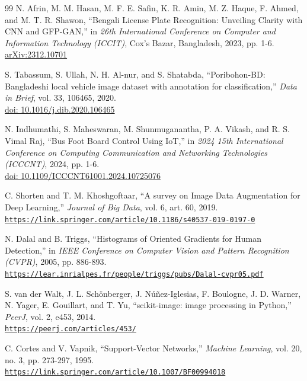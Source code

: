 \documentclass{article}
\renewcommand{\url}[1]{\href{#1}{\nolinkurl{#1}}}
\begin{document}
\begin{thebibliography}{99}
N. Afrin, M. M. Hasan, M. F. E. Safin, K. R. Amin, M. Z. Haque, F. Ahmed, and M. T. R. Shawon,
``Bengali License Plate Recognition: Unveiling Clarity with CNN and GFP-GAN,''
in \textit{26th International Conference on Computer and Information Technology (ICCIT)}, Cox's Bazar, Bangladesh, 2023, pp. 1-6.\\
\href{https://arxiv.org/abs/2312.10701}{arXiv:2312.10701}

S. Tabassum, S. Ullah, N. H. Al-nur, and S. Shatabda,
``Poribohon-BD: Bangladeshi local vehicle image dataset with annotation for classification,''
\textit{Data in Brief}, vol. 33, 106465, 2020.\\
\href{https://doi.org/10.1016/j.dib.2020.106465}{doi: 10.1016/j.dib.2020.106465}

N. Indhumathi, S. Maheswaran, M. Shunmuganantha, P. A. Vikash, and R. S. Vimal Raj,
``Bus Foot Board Control Using IoT,''
in \textit{2024 15th International Conference on Computing Communication and Networking Technologies (ICCCNT)}, 2024, pp. 1-6.\\
\href{https://doi.org/10.1109/ICCCNT61001.2024.10725076}{doi: 10.1109/ICCCNT61001.2024.10725076}

C. Shorten and T. M. Khoshgoftaar,
``A survey on Image Data Augmentation for Deep Learning,''
\textit{Journal of Big Data}, vol. 6, art. 60, 2019.\\
\url{https://link.springer.com/article/10.1186/s40537-019-0197-0}

N. Dalal and B. Triggs,
``Histograms of Oriented Gradients for Human Detection,''
in \textit{IEEE Conference on Computer Vision and Pattern Recognition (CVPR)}, 2005, pp. 886-893.\\
\url{https://lear.inrialpes.fr/people/triggs/pubs/Dalal-cvpr05.pdf}

S. van der Walt, J. L. Sch\"onberger, J. N\'u\~nez-Iglesias, F. Boulogne, J. D. Warner, N. Yager, E. Gouillart, and T. Yu,
``scikit-image: image processing in Python,''
\textit{PeerJ}, vol. 2, e453, 2014.\\
\url{https://peerj.com/articles/453/}

C. Cortes and V. Vapnik,
``Support-Vector Networks,''
\textit{Machine Learning}, vol. 20, no. 3, pp. 273-297, 1995.\\
\url{https://link.springer.com/article/10.1007/BF00994018}


\end{thebibliography}
\end{document}
